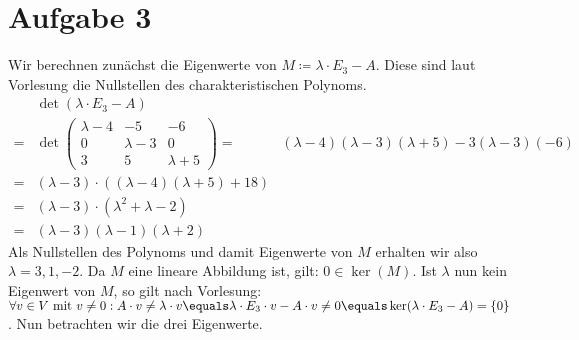 \documentclass{article}
\begin{document}
    \section*{Aufgabe 3}
    Wir berechnen zunächst die Eigenwerte von $M \coloneqq \lambda \cdot E_3 - A$. Diese sind laut Vorlesung die Nullstellen des charakteristischen Polynoms.
    \begin{align*}
        &\det(\lambda \cdot E_3 - A)\\
        =&\det \begin{pmatrix}
            \lambda - 4 & -5 & -6\\
            0 & \lambda -3 & 0\\
            3 & 5 & \lambda + 5
        \end{pmatrix}
        =&(\lambda - 4)(\lambda - 3)(\lambda + 5) - 3 (\lambda - 3)(-6)\\
        =&(\lambda - 3)\cdot ((\lambda-4)(\lambda + 5) + 18)\\
        =&(\lambda - 3)\cdot (\lambda^2 + \lambda - 2)\\
        =&(\lambda - 3)(\lambda - 1)(\lambda + 2)
    \end{align*}
    Als Nullstellen des Polynoms und damit Eigenwerte von $M$ erhalten wir also $\lambda = 3, 1, -2$.
    Da $M$ eine lineare Abbildung ist, gilt: $0 \in \ker(M)$.
    Ist $\lambda$ nun kein Eigenwert von $M$, so gilt nach Vorlesung:
    $\forall v \in V \text{ mit } v \neq 0: A\cdot v \neq \lambda \cdot v \equals \lambda \cdot E_3 \cdot v - A \cdot v \neq 0 \equals \ker(\lambda \cdot E_3 - A) = \{0\}$.
    Nun betrachten wir die drei Eigenwerte.
\end{document}
